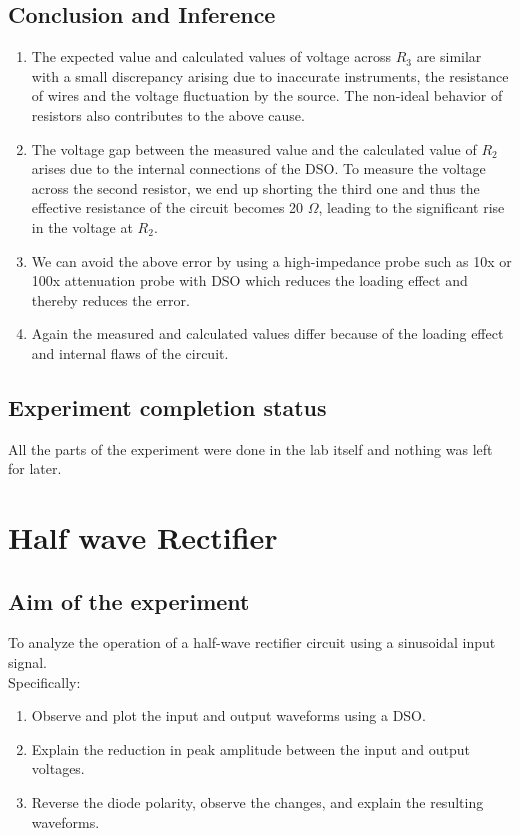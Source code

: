 \documentclass[12pt]{article}
\begin{document}
\subsection{Conclusion and Inference}
\begin{enumerate}
\item The expected value and calculated values of voltage across \(R_3\) are similar with a small discrepancy arising due to inaccurate instruments, the resistance of wires and the voltage fluctuation by the source. The non-ideal behavior of resistors also contributes to the above cause.
\item The voltage gap between the measured value and the calculated value of \(R_2\) arises due to the internal connections of the DSO. To measure the voltage across the second resistor, we end up shorting the third one and thus the effective resistance of the circuit becomes 20 \(\Omega\), leading to the significant rise in the voltage at \(R_2\).
\item We can avoid the above error by using a high-impedance probe such as 10x or 100x attenuation probe with DSO which reduces the loading effect and thereby reduces the error.
\item Again the measured and calculated values differ because of the loading effect and internal flaws of the circuit.

\end{enumerate}
\subsection{Experiment completion status}
All the parts of the experiment were done in the lab itself and nothing was left for later.


\newpage
\section{Half wave Rectifier}
\subsection{Aim of the experiment}
To analyze the operation of a half-wave rectifier circuit using a sinusoidal input signal. \\Specifically:
\begin{enumerate}
\item Observe and plot the input and output waveforms using a DSO.
\item Explain the reduction in peak amplitude between the input and output voltages.
\item Reverse the diode polarity, observe the changes, and explain the resulting waveforms.
\end{enumerate}
\end{document}

